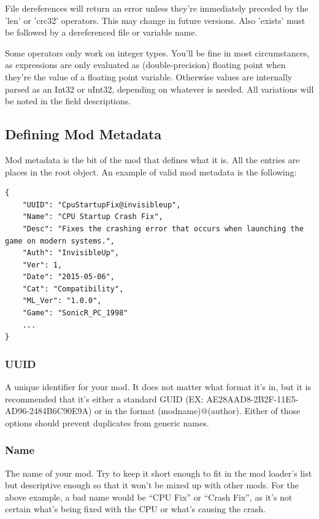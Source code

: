\documentclass[12pt,a4paper,notitlepage]{article}
\begin{document}
File dereferences will return an error unless they're immediately preceded by the 'len' or 'crc32' operators. This may change in future versions. Also 'exists' must be followed by a dereferenced file or variable name.

Some operators only work on integer types. You'll be fine in most circumstances, as expressions are only evaluated as (double-precision) floating point when they're the value of a floating point variable. Otherwise values are internally parsed as an Int32 or uInt32, depending on whatever is needed. All variations will be noted in the field descriptions.

\subsection{Defining Mod Metadata}
\label{subsec:create-meta}
Mod metadata is the bit of the mod that defines what it is. All the entries are places in the root object. An example of valid mod metadata is the following:

\begin{lstlisting}[breaklines=true]
{
    "UUID": "CpuStartupFix@invisibleup",
    "Name": "CPU Startup Crash Fix",
    "Desc": "Fixes the crashing error that occurs when launching the game on modern systems.",
    "Auth": "InvisibleUp",
    "Ver": 1,
    "Date": "2015-05-06",
    "Cat": "Compatibility",
    "ML_Ver": "1.0.0",
    "Game": "SonicR_PC_1998"
    ...
}
\end{lstlisting}

\subsubsection{UUID}
\label{subsubsec:create-meta-uuid}
A unique identifier for your mod. It does not matter what format it's in, but it is recommended that it's either a standard GUID (EX: {AE28AAD8-2B2F-11E5-AD96-2484B6C90E9A}) or in the format (modname)@(author). Either of those options should prevent duplicates from generic names.

\subsubsection{Name}
\label{subsubsec:create-meta-name}
The name of your mod. Try to keep it short enough to fit in the mod loader's list but descriptive enough so that it won't be mixed up with other mods. For the above example, a bad name would be ``CPU Fix'' or ``Crash Fix'', as it's not certain what's being fixed with the CPU or what's causing the crash.
\end{document}
